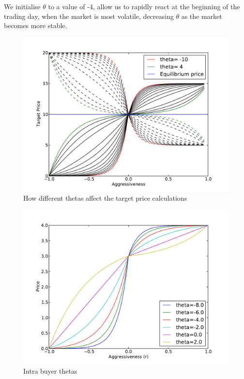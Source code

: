 \documentclass[preprint]{acm_proc_article-sp} %
\begin{document}
We initialise $\theta$ to a value of -4, allow us to rapidly react at the
beginning of the trading day, when the market is most volatile,
decreasing $\theta$ as the market becomes more stable.

\begin{figure}
  \centering
  \label{fig:theta}
  \includegraphics[width=\columnwidth]{graphs_and_stats/graph_thetas.pdf}
  \caption{How different thetas affect the target price calculations}
\end{figure}

\begin{figure} 
\centering
\includegraphics[width=\columnwidth]{graphs_and_stats/graph_intra_buyer_thetas.pdf}
\caption{Intra buyer thetas}
\end{figure}
\end{document}
